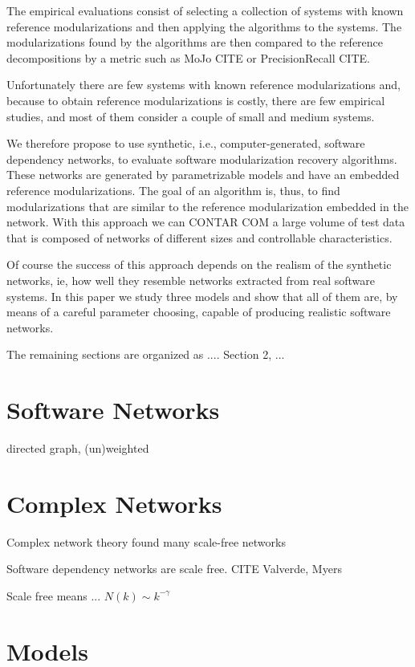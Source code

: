 The empirical evaluations consist of selecting a collection of systems with
known reference modularizations and then applying the algorithms to the systems.
The modularizations found by the algorithms are then compared to the reference
decompositions by a metric such as MoJo CITE or PrecisionRecall CITE.

Unfortunately there are few systems with known reference modularizations and,
because to obtain reference modularizations is costly, there are few empirical
studies, and most of them consider a couple of small and medium systems.

We therefore propose to use synthetic, i.e., computer-generated, software
dependency networks, to evaluate software modularization recovery algorithms.
These networks are generated by parametrizable models and have an embedded
reference modularizations. The goal of an algorithm is, thus, to find
modularizations that are similar to the reference modularization embedded in the
network. With this approach we can CONTAR COM a large volume of test data that
is composed of networks of different sizes and controllable characteristics.

Of course the success of this approach depends on the realism of the synthetic
networks, ie, how well they resemble networks extracted from real software
systems. In this paper we study three models and show that all of them are, by
means of a careful parameter choosing, capable of producing realistic software
networks.

The remaining sections are organized as .... Section 2, ...


\section{Software Networks}

directed graph, (un)weighted

\section{Complex Networks}

Complex network theory found many scale-free networks

Software dependency networks are scale free. CITE Valverde, Myers

Scale free means ... $N(k) \sim k^{-\gamma}$

\section{Models}

